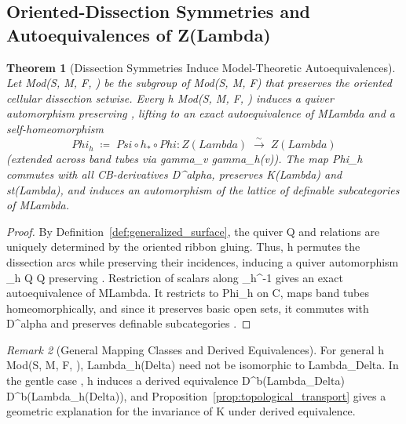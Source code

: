 \documentclass[11pt,a4paper,reqno]{amsart}
\def\({}%
\def\){}%
\def\mathcal#1{#1}%
\def\operatorname#1{#1}%
\def\forb{F}%
\def\Zg{Z}%
\def\Mod{M}%
\def\KG{K}%
\def\gamma{gamma}%
\def\alpha{alpha}%
\def\Psi{Psi}%
\def\Phi{Phi}%
\def\Delta{Delta}%
\def\Lambda{Lambda}%
\newtheorem{theorem}{Theorem}[section]
\theoremstyle{definition}
\theoremstyle{remark}
\newtheorem{remark}[theorem]{Remark}
\newcommand{\Mod}[1]{\operatorname{Mod}(#1)}
\newcommand{\Zg}{\operatorname{Zg}}
\newcommand{\KG}{\operatorname{KG}}
\newcommand{\forb}{\mathfrak{F}}
\begin{document}
\subsection{Oriented-Dissection Symmetries and Autoequivalences of \(\Zg(\Lambda)\)}
\label{subsec:autoequivalences}

\begin{theorem}[Dissection Symmetries Induce Model-Theoretic Autoequivalences]
\label{thm:mcg_autoequivalence}
Let \(\operatorname{Mod}(\mathcal{S}, \mathcal{M}, \forb, \vec{\Delta})\) be the subgroup of \(\operatorname{Mod}(\mathcal{S}, \mathcal{M}, \forb)\) that preserves the oriented cellular dissection \(\vec{\Delta}\) setwise. Every \(h \in \operatorname{Mod}(\mathcal{S}, \mathcal{M}, \forb, \vec{\Delta})\) induces a quiver automorphism preserving \(\rho\), lifting to an exact autoequivalence of \(\Mod{\Lambda}\) and a self-homeomorphism
\[
\Phi_h \;\coloneqq\; \Psi \circ h_* \circ \Phi \colon \Zg(\Lambda) \;\xrightarrow{\;\sim\;}\; \Zg(\Lambda)
\]
(extended across band tubes via \(\gamma_v \mapsto \gamma_{h(v)}\)). The map \(\Phi_h\) commutes with all CB-derivatives \(D^\alpha\), preserves \(\KG(\Lambda)\) and \(\operatorname{st}(\Lambda)\), and induces an automorphism of the lattice of definable subcategories of \(\Mod{\Lambda}\).
\end{theorem}

\begin{proof}
By Definition~\ref{def:generalized_surface}, the quiver \(\mathcal{Q}\) and relations \(\rho\) are uniquely determined by the oriented ribbon gluing. Thus, \(h\) permutes the dissection arcs while preserving their incidences, inducing a quiver automorphism \(\sigma_h \colon \mathcal{Q} \xrightarrow{\sim} \mathcal{Q}\) preserving \(\rho\). Restriction of scalars along \(\sigma_h^{-1}\) gives an exact autoequivalence of \(\Mod{\Lambda}\). It restricts to \(\Phi_h\) on \(C\), maps band tubes homeomorphically, and since it preserves basic open sets, it commutes with \(D^\alpha\) and preserves definable subcategories \cite{Ziegler1984, Prest2009}.
\end{proof}

\begin{remark}[General Mapping Classes and Derived Equivalences]
\label{rem:general_mapping_classes}
For general \(h \notin \operatorname{Mod}(\mathcal{S}, \mathcal{M}, \forb, \vec{\Delta})\), \(\Lambda_{h(\Delta)}\) need not be isomorphic to \(\Lambda_\Delta\). In the gentle case \cite{OPS2018}, \(h\) induces a derived equivalence \(D^b(\Lambda_\Delta) \cong D^b(\Lambda_{h(\Delta)})\), and Proposition~\ref{prop:topological_transport} gives a geometric explanation for the invariance of \(\KG\) under derived equivalence.
\end{remark}
\end{document}
